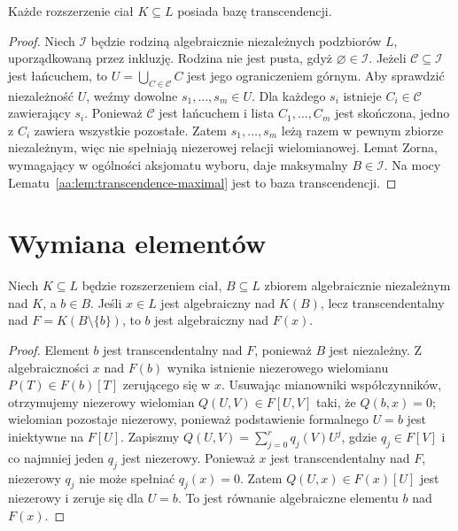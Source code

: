 \begin{twierdzenie}
\label{aa:tw:transcendence-existence}
Każde rozszerzenie ciał $K\subseteq L$ posiada bazę transcendencji.
\end{twierdzenie}
\begin{proof}
Niech $\mathcal I$ będzie rodziną algebraicznie niezależnych
podzbiorów $L$, uporządkowaną przez inkluzję.
Rodzina nie jest pusta, gdyż $\varnothing\in\mathcal I$.
Jeżeli $\mathcal C\subseteq\mathcal I$ jest łańcuchem,
to $U=\bigcup_{C\in\mathcal C}C$ jest jego ograniczeniem górnym.
Aby sprawdzić niezależność $U$, weźmy dowolne
$s_1,\ldots,s_m\in U$. Dla każdego $s_i$ istnieje
$C_i\in\mathcal C$ zawierający $s_i$. Ponieważ $\mathcal C$
jest łańcuchem i lista $C_1,\ldots,C_m$ jest skończona,
jedno z $C_i$ zawiera wszystkie pozostałe. Zatem
$s_1,\ldots,s_m$ leżą razem w pewnym zbiorze niezależnym,
więc nie spełniają niezerowej relacji wielomianowej.
Lemat Zorna, wymagający w ogólności aksjomatu wyboru,
daje maksymalny $B\in\mathcal I$.
Na mocy Lematu~\ref{aa:lem:transcendence-maximal}
jest to baza transcendencji.
\end{proof}

\section{Wymiana elementów}
\begin{lemat}
\label{aa:lem:transcendence-exchange}
Niech $K\subseteq L$ będzie rozszerzeniem ciał,
$B\subseteq L$ zbiorem algebraicznie niezależnym nad $K$,
a $b\in B$. Jeśli $x\in L$ jest algebraiczny nad $K(B)$,
lecz transcendentalny nad $F=K(B\setminus\{b\})$,
to $b$ jest algebraiczny nad $F(x)$.
\end{lemat}
\begin{proof}
Element $b$ jest transcendentalny nad $F$, ponieważ $B$ jest
niezależny. Z algebraiczności $x$ nad $F(b)$ wynika istnienie
niezerowego wielomianu $P(T)\in F(b)[T]$ zerującego się w $x$.
Usuwając mianowniki współczynników, otrzymujemy
niezerowy wielomian $Q(U,V)\in F[U,V]$
taki, że $Q(b,x)=0$; wielomian pozostaje niezerowy,
ponieważ podstawienie formalnego $U=b$ jest iniektywne
na $F[U]$.
Zapiszmy $Q(U,V)=\sum_{j=0}^r q_j(V)U^j$,
gdzie $q_j\in F[V]$ i co najmniej jeden $q_j$ jest niezerowy.
Ponieważ $x$ jest transcendentalny nad $F$,
niezerowy $q_j$ nie może spełniać $q_j(x)=0$.
Zatem $Q(U,x)\in F(x)[U]$ jest niezerowy i zeruje się
dla $U=b$. To jest równanie algebraiczne elementu $b$
nad $F(x)$.
\end{proof}


